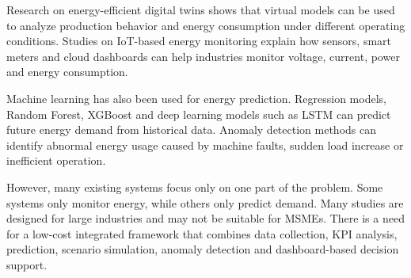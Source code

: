 Research on energy-efficient digital twins shows that virtual models can be used to analyze production behavior and energy consumption under different operating conditions. Studies on IoT-based energy monitoring explain how sensors, smart meters and cloud dashboards can help industries monitor voltage, current, power and energy consumption.

Machine learning has also been used for energy prediction. Regression models, Random Forest, XGBoost and deep learning models such as LSTM can predict future energy demand from historical data. Anomaly detection methods can identify abnormal energy usage caused by machine faults, sudden load increase or inefficient operation.

However, many existing systems focus only on one part of the problem. Some systems only monitor energy, while others only predict demand. Many studies are designed for large industries and may not be suitable for MSMEs. There is a need for a low-cost integrated framework that combines data collection, KPI analysis, prediction, scenario simulation, anomaly detection and dashboard-based decision support.

